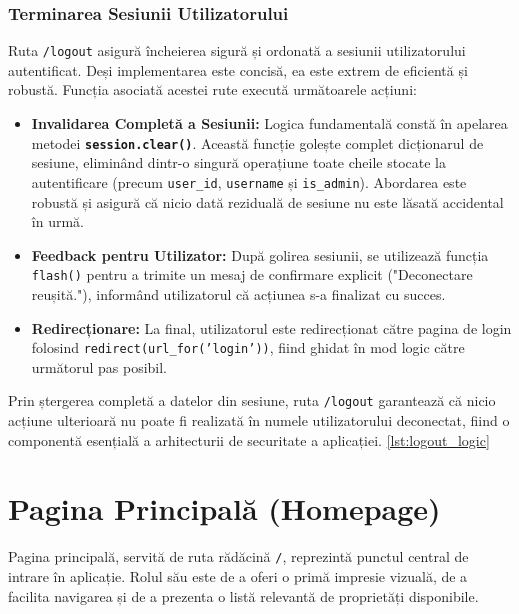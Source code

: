 \documentclass[12pt, a4paper, oneside, romanian]{teza-upb}
\begin{document}
\subsubsection{Terminarea Sesiunii Utilizatorului}
Ruta \texttt{/logout} asigură încheierea sigură și ordonată a sesiunii utilizatorului autentificat. Deși implementarea este concisă, ea este extrem de eficientă și robustă. Funcția asociată acestei rute execută următoarele acțiuni:

\begin{itemize}
	\item \textbf{Invalidarea Completă a Sesiunii:} Logica fundamentală constă în apelarea metodei \textbf{\texttt{session.clear()}}. Această funcție golește complet dicționarul de sesiune, eliminând dintr-o singură operațiune toate cheile stocate la autentificare (precum \texttt{user\_id}, \texttt{username} și \texttt{is\_admin}). Abordarea este robustă și asigură că nicio dată reziduală de sesiune nu este lăsată accidental în urmă.
	
	\item \textbf{Feedback pentru Utilizator:} După golirea sesiunii, se utilizează funcția \texttt{flash()} pentru a trimite un mesaj de confirmare explicit ("Deconectare reușită."), informând utilizatorul că acțiunea s-a finalizat cu succes.
	
	\item \textbf{Redirecționare:} La final, utilizatorul este redirecționat către pagina de login folosind \texttt{redirect(url\_for('login'))}, fiind ghidat în mod logic către următorul pas posibil.
\end{itemize}

Prin ștergerea completă a datelor din sesiune, ruta \texttt{/logout} garantează că nicio acțiune ulterioară nu poate fi realizată în numele utilizatorului deconectat, fiind o componentă esențială a arhitecturii de securitate a aplicației. \ref {lst:logout_logic}





\section{Pagina Principală (Homepage)}
Pagina principală, servită de ruta rădăcină \texttt{/}, reprezintă punctul central de intrare în aplicație. Rolul său este de a oferi o primă impresie vizuală, de a facilita navigarea și de a prezenta o listă relevantă de proprietăți disponibile.
\end{document}
